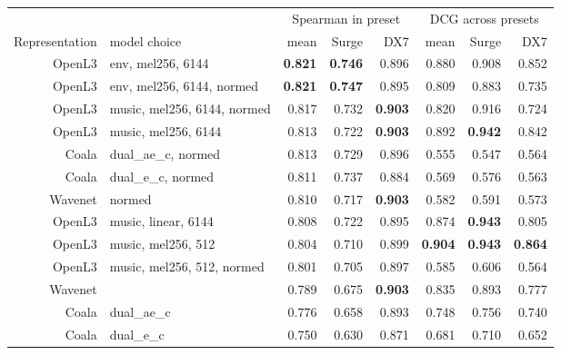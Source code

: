 
\begin{table}[ht]
  \centering
  \small
  \tabcolsep=0.11cm
  \begin{tabular}{rlrrrrrr}
{} & & \multicolumn{3}{c}{Spearman in preset} & \multicolumn{3}{c}{DCG across presets} \\
Representation & model choice &  mean & Surge & DX7 & mean & Surge & DX7  \\
\hline
OpenL3 \cite{cramer:learnmore:icassp:19} & env, mel256, 6144  & \textbf{0.821} & \textbf{0.746} & 0.896 & 0.880 & 0.908 &  0.852 \\
OpenL3 \cite{cramer:learnmore:icassp:19}& env, mel256, 6144, normed &         \textbf{0.821} & \textbf{0.747} & 0.895 & 0.809 & 0.883 & 0.735 \\
OpenL3 \cite{cramer:learnmore:icassp:19} & music, mel256, 6144, normed & 0.817 & 0.732 & \textbf{0.903} & 0.820 & 0.916 & 0.724 \\
OpenL3 \cite{cramer:learnmore:icassp:19} & music, mel256, 6144  & 0.813 & 0.722 & \textbf{0.903} & 0.892 & \textbf{0.942} & 0.842 \\
Coala \cite{drossos:icml:2020} & dual\_ae\_c, normed & 0.813 & 0.729 &
 0.896 & 0.555 & 0.547 & 0.564 \\
Coala \cite{drossos:icml:2020} & dual\_e\_c, normed &          0.811 & 0.737 & 0.884 & 0.569 & 0.576 & 0.563 \\
 Wavenet \cite{engel2017neural} & normed & 0.810 & 0.717 & \textbf{0.903} &  0.582 & 0.591 & 0.573 \\
OpenL3 \cite{cramer:learnmore:icassp:19} & music, linear, 6144 & 0.808 & 0.722 & 0.895 & 0.874 & \textbf{0.943} & 0.805 \\
OpenL3 \cite{cramer:learnmore:icassp:19} & music, mel256, 512 & 0.804 &           0.710 & 0.899 & \textbf{0.904} & \textbf{0.943} & \textbf{0.864} \\
OpenL3 \cite{cramer:learnmore:icassp:19} & music, mel256, 512, normed & 0.801 & 0.705 & 0.897 & 0.585 & 0.606 & 0.564 \\
Wavenet \cite{engel2017neural} & & 0.789 & 0.675 &  \textbf{0.903} &             0.835 &              0.893 &                 0.777 \\
Coala \cite{drossos:icml:2020} & dual\_ae\_c &         0.776 &           0.658 &              0.893 &             0.748 &              0.756 &                 0.740 \\
Coala \cite{drossos:icml:2020} & dual\_e\_c &         0.750 &           0.630 &
 0.871 &             0.681 &              0.710 &                 0.652 \\

\end{tabular}
\end{table}
